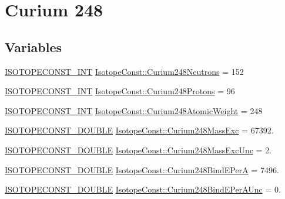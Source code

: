 \hypertarget{group___isotope_const-_curium-_cm248}{}\section{Curium 248}
\label{group___isotope_const-_curium-_cm248}
\subsection*{Variables}
\begin{DoxyCompactItemize}
\item 
\mbox{\hyperlink{group___isotope_const-_macros_ga5f18360b3e99483a35c32d789e62621c}{I\+S\+O\+T\+O\+P\+E\+C\+O\+N\+S\+T\+\_\+\+I\+NT}} \mbox{\hyperlink{group___isotope_const-_curium-_cm248_ga33915ae88dd94379e1b0302700df36a7}{Isotope\+Const\+::\+Curium248\+Neutrons}} = 152
\item 
\mbox{\hyperlink{group___isotope_const-_macros_ga5f18360b3e99483a35c32d789e62621c}{I\+S\+O\+T\+O\+P\+E\+C\+O\+N\+S\+T\+\_\+\+I\+NT}} \mbox{\hyperlink{group___isotope_const-_curium-_cm248_ga2bf4d863cd2a922c70c313982a908567}{Isotope\+Const\+::\+Curium248\+Protons}} = 96
\item 
\mbox{\hyperlink{group___isotope_const-_macros_ga5f18360b3e99483a35c32d789e62621c}{I\+S\+O\+T\+O\+P\+E\+C\+O\+N\+S\+T\+\_\+\+I\+NT}} \mbox{\hyperlink{group___isotope_const-_curium-_cm248_ga0acc7de7545de7df3c218f8d32aa2d1e}{Isotope\+Const\+::\+Curium248\+Atomic\+Weight}} = 248
\item 
\mbox{\hyperlink{group___isotope_const-_macros_ga8f45a7272ce02c0b4c65c44636ed719a}{I\+S\+O\+T\+O\+P\+E\+C\+O\+N\+S\+T\+\_\+\+D\+O\+U\+B\+LE}} \mbox{\hyperlink{group___isotope_const-_curium-_cm248_ga541197981e5e740f9a32ab3314e38ee0}{Isotope\+Const\+::\+Curium248\+Mass\+Exc}} = 67392.
\item 
\mbox{\hyperlink{group___isotope_const-_macros_ga8f45a7272ce02c0b4c65c44636ed719a}{I\+S\+O\+T\+O\+P\+E\+C\+O\+N\+S\+T\+\_\+\+D\+O\+U\+B\+LE}} \mbox{\hyperlink{group___isotope_const-_curium-_cm248_ga2cecb9de93b2eefca7a70ea74cf057fb}{Isotope\+Const\+::\+Curium248\+Mass\+Exc\+Unc}} = 2.
\item 
\mbox{\hyperlink{group___isotope_const-_macros_ga8f45a7272ce02c0b4c65c44636ed719a}{I\+S\+O\+T\+O\+P\+E\+C\+O\+N\+S\+T\+\_\+\+D\+O\+U\+B\+LE}} \mbox{\hyperlink{group___isotope_const-_curium-_cm248_ga32750dac35d0b29344a09b8d96aab582}{Isotope\+Const\+::\+Curium248\+Bind\+E\+PerA}} = 7496.
\item 
\mbox{\hyperlink{group___isotope_const-_macros_ga8f45a7272ce02c0b4c65c44636ed719a}{I\+S\+O\+T\+O\+P\+E\+C\+O\+N\+S\+T\+\_\+\+D\+O\+U\+B\+LE}} \mbox{\hyperlink{group___isotope_const-_curium-_cm248_gae619b6d174bc5507975f5b5ac396a721}{Isotope\+Const\+::\+Curium248\+Bind\+E\+Per\+A\+Unc}} = 0.

\end{DoxyCompactItemize}
